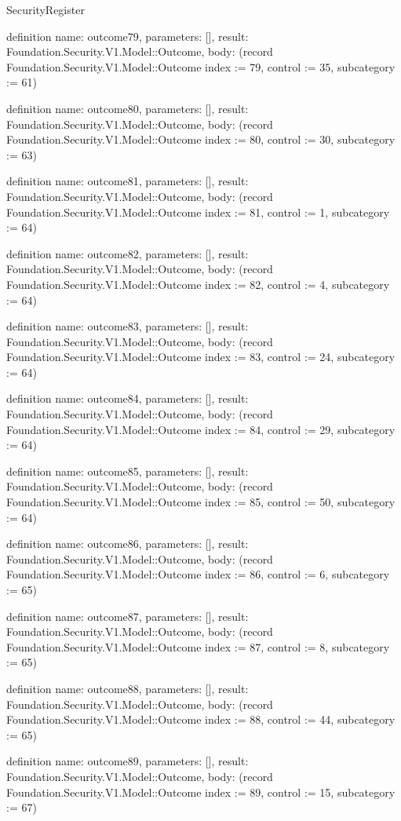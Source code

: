 \begin{lexlean}{SecurityRegister}
\begin{semanticmodule}
definition{
  name: outcome79,
  parameters: [],
  result: Foundation.Security.V1.Model::Outcome,
  body: (record Foundation.Security.V1.Model::Outcome {index := 79, control := 35, subcategory := 61})
}

definition{
  name: outcome80,
  parameters: [],
  result: Foundation.Security.V1.Model::Outcome,
  body: (record Foundation.Security.V1.Model::Outcome {index := 80, control := 30, subcategory := 63})
}

definition{
  name: outcome81,
  parameters: [],
  result: Foundation.Security.V1.Model::Outcome,
  body: (record Foundation.Security.V1.Model::Outcome {index := 81, control := 1, subcategory := 64})
}

definition{
  name: outcome82,
  parameters: [],
  result: Foundation.Security.V1.Model::Outcome,
  body: (record Foundation.Security.V1.Model::Outcome {index := 82, control := 4, subcategory := 64})
}

definition{
  name: outcome83,
  parameters: [],
  result: Foundation.Security.V1.Model::Outcome,
  body: (record Foundation.Security.V1.Model::Outcome {index := 83, control := 24, subcategory := 64})
}

definition{
  name: outcome84,
  parameters: [],
  result: Foundation.Security.V1.Model::Outcome,
  body: (record Foundation.Security.V1.Model::Outcome {index := 84, control := 29, subcategory := 64})
}

definition{
  name: outcome85,
  parameters: [],
  result: Foundation.Security.V1.Model::Outcome,
  body: (record Foundation.Security.V1.Model::Outcome {index := 85, control := 50, subcategory := 64})
}

definition{
  name: outcome86,
  parameters: [],
  result: Foundation.Security.V1.Model::Outcome,
  body: (record Foundation.Security.V1.Model::Outcome {index := 86, control := 6, subcategory := 65})
}

definition{
  name: outcome87,
  parameters: [],
  result: Foundation.Security.V1.Model::Outcome,
  body: (record Foundation.Security.V1.Model::Outcome {index := 87, control := 8, subcategory := 65})
}

definition{
  name: outcome88,
  parameters: [],
  result: Foundation.Security.V1.Model::Outcome,
  body: (record Foundation.Security.V1.Model::Outcome {index := 88, control := 44, subcategory := 65})
}

definition{
  name: outcome89,
  parameters: [],
  result: Foundation.Security.V1.Model::Outcome,
  body: (record Foundation.Security.V1.Model::Outcome {index := 89, control := 15, subcategory := 67})
}


\end{semanticmodule}
\end{lexlean}
